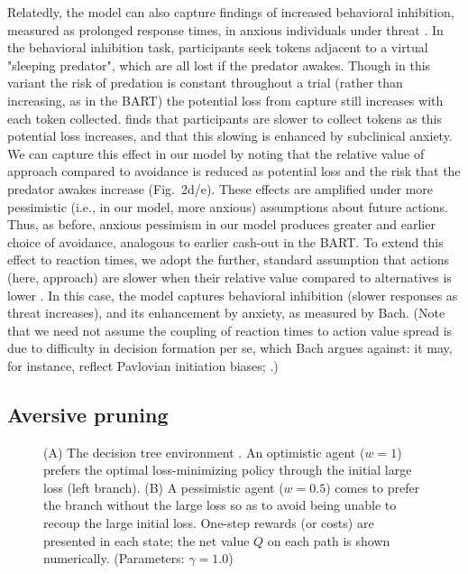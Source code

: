 \documentclass[manuscript]{stjour}
\begin{document}
Relatedly, the model can also capture findings of increased behavioral inhibition, measured as prolonged response times, in anxious individuals under threat \citep{bach2015}. In the behavioral inhibition task, participants seek tokens adjacent to a virtual "sleeping predator", which are all lost if the predator awakes. Though in this variant the risk of predation is constant throughout a trial (rather than increasing, as in the BART) the potential loss from capture still increases with each token collected. \citeauthor{bach2015} finds that participants are slower to collect tokens as this potential loss increases, and that this slowing is enhanced by subclinical anxiety. We can capture this effect in our model by noting that the relative value of approach compared to avoidance is reduced as potential loss and the risk that the predator awakes increase (Fig.~2d/e). These effects are amplified under more pessimistic (i.e., in our model, more anxious) assumptions about future actions. Thus, as before, anxious pessimism in our model produces greater and earlier choice of avoidance, analogous to earlier cash-out in the BART. To extend this effect to reaction times, we adopt the further, standard assumption that actions (here, approach) are slower when their relative value compared to alternatives is lower \citep{oud2016}. In this case, the model captures behavioral inhibition (slower responses as threat increases), and its enhancement by anxiety, as measured by Bach. (Note that we need not assume the coupling of reaction times to action value spread is due to difficulty in decision formation per se, which Bach argues against: it may, for instance, reflect Pavlovian initiation biases; \citealp{niv2007}.)

\subsection{Aversive pruning} 

\begin{figure}[!b]
\caption{(A) The decision tree environment \citep{Huys2012, Lally2017}. An optimistic agent ($w=1$) prefers the optimal loss-minimizing policy through the initial large loss (left branch). (B) A pessimistic agent ($w=0.5$) comes to prefer the branch without the large loss so as to avoid being unable to recoup the large initial loss. One-step rewards (or costs) are presented in each state; the net value $Q$ on each path is shown numerically. (Parameters: $\gamma = 1.0$)}
\label{fig:tree}
\end{figure}
\end{document}
